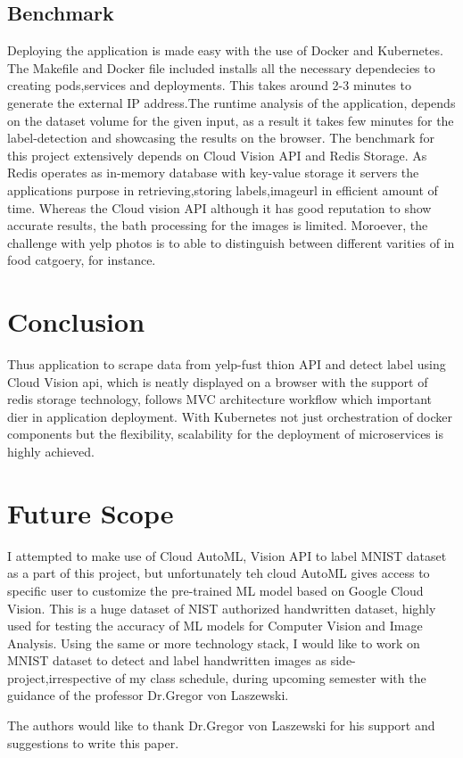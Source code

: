 \subsection{Benchmark}

Deploying the application is made easy with the use of Docker and
Kubernetes.  The Makefile and Docker file included installs all the
necessary dependecies to creating pods,services and deployments. This
takes around 2-3 minutes to generate the external IP address.The
runtime analysis of the application, depends on the dataset volume for
the given input, as a result it takes few minutes for the
label-detection and showcasing the results on the browser. The
benchmark for this project extensively depends on Cloud Vision API and
Redis Storage. As Redis operates as in-memory database with key-value
storage it servers the applications purpose in retrieving,storing
labels,imageurl in efficient amount of time. Whereas the Cloud vision
API although it has good reputation to show accurate results, the bath
processing for the images is limited. Moroever, the challenge with
yelp photos is to able to distinguish between different varities of in
food catgoery, for instance.

\section{Conclusion}

Thus application to scrape data from yelp-fust thion API and detect label
using Cloud Vision api, which is neatly displayed on a browser with
the support of redis storage technology, follows MVC architecture
workflow which important dier in application deployment. With
Kubernetes not just orchestration of docker components but the
flexibility, scalability for the deployment of microservices is highly
achieved.
  
\section{Future Scope}

I attempted to make use of Cloud AutoML, Vision API to label MNIST
dataset as a part of this project, but unfortunately teh cloud AutoML
gives access to specific user to customize the pre-trained ML model
based on Google Cloud Vision. This is a huge dataset of NIST
authorized handwritten dataset, highly used for testing the accuracy
of ML models for Computer Vision and Image Analysis. Using the same or
more technology stack, I would like to work on MNIST dataset to detect
and label handwritten images as side-project,irrespective of my class
schedule, during upcoming semester with the guidance of the professor
Dr.Gregor von Laszewski.

\begin{acks}

  The authors would like to thank Dr.Gregor von Laszewski for his
  support and suggestions to write this paper.
  
\end{acks}




